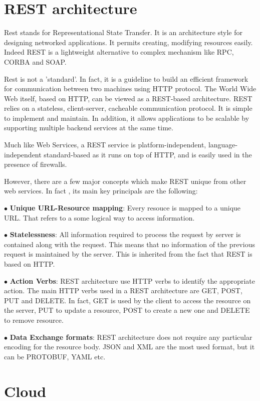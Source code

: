 \section{REST architecture}
Rest stands for Representational State Transfer. It is an architecture style for
designing networked applications. It permits creating, modifying resources
easily. Indeed REST is a lightweight alternative to complex mechanism like RPC,
CORBA and SOAP.

Rest is not a 'standard'. In fact,  it is a guideline to build an efficient
framework for communication between two machines using HTTP protocol. The World
Wide Web itself, based on HTTP, can be viewed as a REST-based architecture. REST
relies on a stateless, client-server, cacheable communication protocol. It is
simple to implement and maintain. In addition, it allows applications to be scalable
by supporting multiple backend services at the same time.

Much like Web Services, a REST service is platform-independent,
language-independent standard-based as it runs on top of HTTP, and is easily used
in the presence of firewalls.

However, there are a few major concepts which make REST unique from other web
services. In fact , its main key principals are the following:

$\bullet$ \textbf{Unique URL-Resource mapping}: Every resouce is mapped to a unique URL. That
refers to a some logical way  to access information. 

$\bullet$ \textbf{Statelessness}: All information required to process the request by server is
contained along with the request. This means that no information of the previous
request is maintained by the server. This is inherited from the fact that REST
is based on HTTP.

$\bullet$ \textbf{Action Verbs}: REST architecture use HTTP verbs to identify the appropriate
action. The main HTTP verbs used in a REST architecture are GET, POST, PUT and
DELETE. In fact, GET is used by the client to access the resource on the server,
PUT to update a resource, POST to create a new one and DELETE to remove
resource.

$\bullet$ \textbf{Data Exchange formats}: REST architecture does not require any particular
encoding for the resource body. JSON \cite{json} and XML are the most used format, but it
can be PROTOBUF, YAML etc. 

\section{Cloud}

